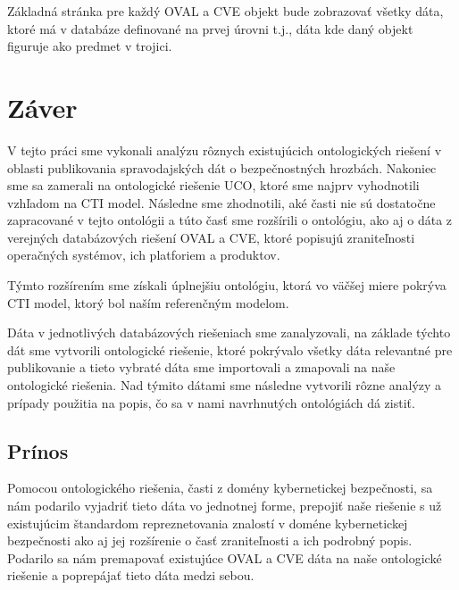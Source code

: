 \documentclass[12pt, a4paper, oneside]{book}
\begin{document}
Základná stránka pre každý OVAL a CVE objekt bude zobrazovať všetky dáta, ktoré má v databáze definované na prvej úrovni t.j., dáta kde daný objekt figuruje ako predmet v trojici. 



\chapter{Záver}

V tejto práci sme vykonali analýzu rôznych existujúcich ontologických riešení v
oblasti publikovania spravodajských dát o bezpečnostných hrozbách. Nakoniec sme
sa zamerali na ontologické riešenie UCO, ktoré sme najprv vyhodnotili vzhľadom
na CTI model. Následne sme zhodnotili, aké časti nie sú dostatočne zapracované
v tejto ontológii a túto časť sme rozšírili o ontológiu, ako aj o dáta z
verejných databázových riešení OVAL a CVE, ktoré popisujú zraniteľnosti
operačných systémov, ich platforiem a produktov.


Týmto rozšírením sme získali úplnejšiu ontológiu, ktorá vo väčšej miere pokrýva CTI model, ktorý bol naším referenčným modelom.

Dáta v jednotlivých databázových riešeniach sme zanalyzovali, na základe týchto dát sme vytvorili ontologické riešenie, ktoré pokrývalo všetky dáta relevantné pre publikovanie a tieto vybraté dáta sme importovali a zmapovali na naše ontologické riešenia. Nad týmito dátami sme následne vytvorili rôzne analýzy a prípady použitia na popis, čo sa v nami navrhnutých ontológiách dá zistiť.


\section*{Prínos}
Pomocou ontologického riešenia, časti z domény kybernetickej bezpečnosti, sa nám podarilo vyjadriť tieto dáta vo jednotnej forme, prepojiť naše riešenie s už existujúcim štandardom repreznetovania znalostí v doméne kybernetickej bezpečnosti ako aj jej rozšírenie o časť zraniteľnosti a ich podrobný popis. Podarilo sa nám premapovať existujúce OVAL a CVE dáta na naše ontologické riešenie a poprepájať tieto dáta medzi sebou.
\end{document}
